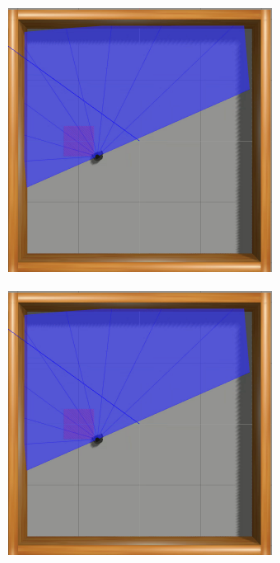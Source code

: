 \begin{figure}[H]
\begin{center}
\begin{subfigure}[b]{0.60\textwidth}
\begin{subfigure}[b]{0.24\textwidth}
        \end{subfigure}
        \hfill
        \begin{subfigure}[b]{0.24\textwidth}
            \includegraphics[width=\textwidth]{imagens/simulated_envs/sim_env1_sac/7.png}
        \end{subfigure}
        \hfill
        \begin{subfigure}[b]{0.24\textwidth}
            \includegraphics[width=\textwidth]{imagens/simulated_envs/sim_env1_sac/7.png}

\end{subfigure}
\end{subfigure}
\end{center}
\end{figure}
